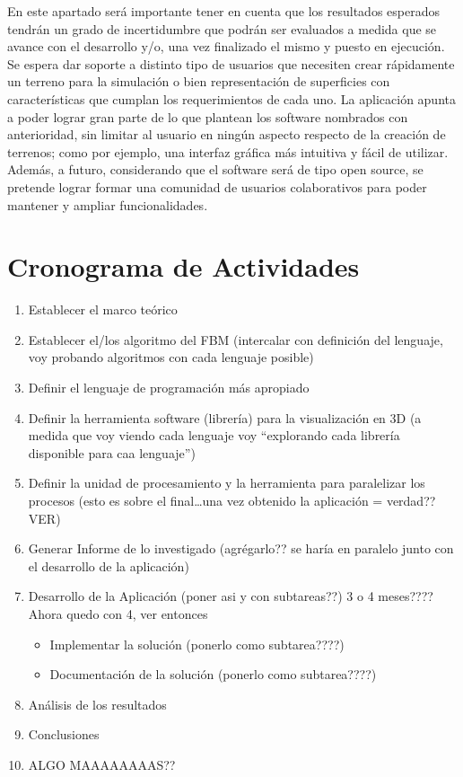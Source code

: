 \documentclass[12pt]{article} %
\begin{document}
En este apartado será importante tener en cuenta que los resultados esperados tendrán un grado de incertidumbre que podrán ser evaluados a medida que se avance con el desarrollo y/o, una vez finalizado el mismo y puesto en ejecución.
Se espera dar soporte a distinto tipo de usuarios que necesiten crear rápidamente un terreno para la simulación o bien representación de superficies con características que cumplan los requerimientos de cada uno.
La aplicación apunta a poder lograr gran parte de lo que plantean los software nombrados con anterioridad, sin limitar al usuario en ningún aspecto respecto de la creación de terrenos; como por ejemplo, una interfaz gráfica más intuitiva y fácil de utilizar.
Además, a futuro, considerando que el software será de tipo open source, se pretende lograr formar una comunidad de usuarios colaborativos para poder mantener y ampliar funcionalidades.




\section{Cronograma de Actividades} %
\begin{enumerate}
\item Establecer el marco teórico 
\item Establecer el/los algoritmo del FBM (intercalar con definición del lenguaje, voy probando algoritmos con cada lenguaje posible)
\item Definir el lenguaje de programación más apropiado
\item Definir la herramienta software (librería) para la visualización en 3D (a medida que voy viendo cada lenguaje voy “explorando cada librería disponible para caa lenguaje”)
\item Definir la unidad de procesamiento y la herramienta  para paralelizar los procesos (esto es sobre el final…una vez obtenido la aplicación = verdad?? VER)
\item Generar Informe de lo investigado (agrégarlo?? se haría en paralelo junto con el desarrollo de la aplicación)
\item Desarrollo de la Aplicación (poner asi y con subtareas??) 3 o 4 meses???? Ahora quedo con 4, ver entonces
\begin{itemize}
\item Implementar la solución (ponerlo como subtarea????)
\item Documentación de la solución (ponerlo como subtarea????)
\end{itemize}
\item Análisis de los resultados
\item Conclusiones
\item ALGO MAAAAAAAAS??
\end{enumerate}
\end{document}
